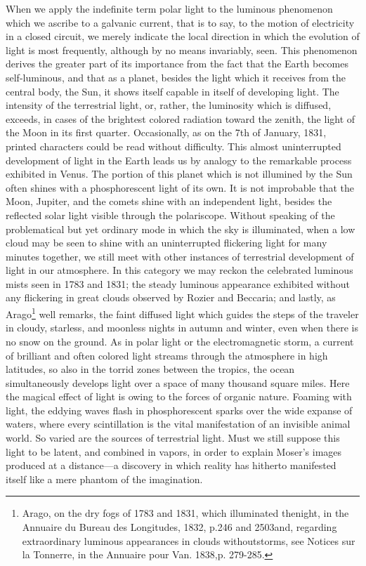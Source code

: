 When we apply the indefinite term polar light to the luminous phenomenon which we ascribe to a galvanic current, that is to say, to the motion of electricity in a closed circuit, we merely indicate the local direction in which the evolution of light is most frequently, although by no means invariably, seen. This phenomenon derives the greater part of its importance from the fact that the Earth becomes self-luminous, and that as a planet, besides the light which it receives from the central body, the Sun, it shows itself capable in itself of developing light. The intensity of the terrestrial light, or, rather, the luminosity which is diffused, exceeds, in cases of the brightest colored radiation toward the zenith, the light of the Moon in its first quarter. Occasionally, as on the 7th of January, 1831, printed characters could be read without difficulty. This almost uninterrupted development of light in the Earth leads us by analogy to the remarkable process exhibited in Venus. The portion of this planet which is not illumined by the Sun often shines with a phosphorescent light of its own. It is not improbable that the Moon, Jupiter, and the comets shine with an independent light, besides the reflected solar light visible through the polariscope. Without speaking of the problematical but yet ordinary mode in which the sky is illuminated, when a low cloud may be seen to shine with an uninterrupted flickering light for many minutes together, we still meet with other instances of terrestrial development of light in our atmosphere. In this category we may reckon the celebrated luminous mists seen in 1783 and 1831; the steady luminous appearance exhibited without any flickering in great clouds observed by Rozier and Beccaria; and lastly, as Arago\footnote{Arago, on the dry fogs of 1783 and 1831, which illuminated thenight, in the Annuaire du Bureau des Longitudes, 1832, p.246 and 2503and, regarding extraordinary luminous appearances in clouds withoutstorms, see Notices sur la Tonnerre, in the Annuaire pour Van. 1838,p. 279-285.} well remarks, the faint diffused light which guides the steps of the traveler in cloudy, starless, and moonless nights in autumn and winter, even when there is no snow on the ground. As in polar light or the electromagnetic storm, a current of brilliant and often colored light streams through the atmosphere in high latitudes, so also in the torrid zones between the tropics, the ocean simultaneously develops light over a space of many thousand square miles. Here the magical effect of light is owing to the forces of organic nature. Foaming with light, the eddying waves flash in phosphorescent sparks over the wide expanse of waters, where every scintillation is the vital manifestation of an invisible animal world. So varied are the sources of terrestrial light. Must we still suppose this light to be latent, and combined in vapors, in order to explain Moser's images produced at a distance—a discovery in which reality has hitherto manifested itself like a mere phantom of the imagination.
    